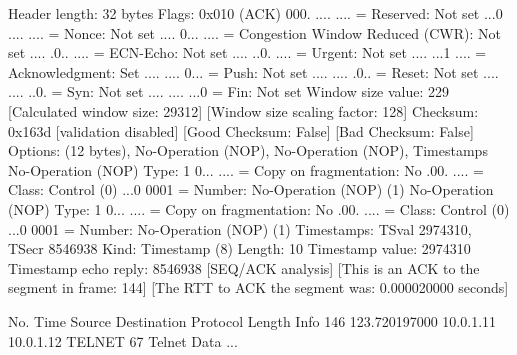     Header length: 32 bytes
    Flags: 0x010 (ACK)
        000. .... .... = Reserved: Not set
        ...0 .... .... = Nonce: Not set
        .... 0... .... = Congestion Window Reduced (CWR): Not set
        .... .0.. .... = ECN-Echo: Not set
        .... ..0. .... = Urgent: Not set
        .... ...1 .... = Acknowledgment: Set
        .... .... 0... = Push: Not set
        .... .... .0.. = Reset: Not set
        .... .... ..0. = Syn: Not set
        .... .... ...0 = Fin: Not set
    Window size value: 229
    [Calculated window size: 29312]
    [Window size scaling factor: 128]
    Checksum: 0x163d [validation disabled]
        [Good Checksum: False]
        [Bad Checksum: False]
    Options: (12 bytes), No-Operation (NOP), No-Operation (NOP), Timestamps
        No-Operation (NOP)
            Type: 1
                0... .... = Copy on fragmentation: No
                .00. .... = Class: Control (0)
                ...0 0001 = Number: No-Operation (NOP) (1)
        No-Operation (NOP)
            Type: 1
                0... .... = Copy on fragmentation: No
                .00. .... = Class: Control (0)
                ...0 0001 = Number: No-Operation (NOP) (1)
        Timestamps: TSval 2974310, TSecr 8546938
            Kind: Timestamp (8)
            Length: 10
            Timestamp value: 2974310
            Timestamp echo reply: 8546938
    [SEQ/ACK analysis]
        [This is an ACK to the segment in frame: 144]
        [The RTT to ACK the segment was: 0.000020000 seconds]

No.     Time           Source                Destination           Protocol Length Info
    146 123.720197000  10.0.1.11             10.0.1.12             TELNET   67     Telnet Data ...

